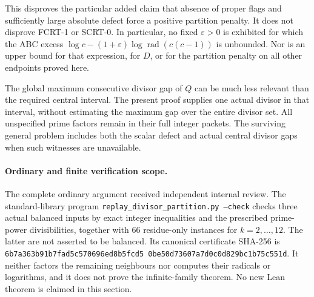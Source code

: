 This disproves the particular added claim that absence of proper flags
and sufficiently large absolute defect force a positive partition penalty.
It does not disprove FCRT-1 or SCRT-0. In particular, no fixed
\(\varepsilon>0\) is exhibited for which the ABC excess
\(\log c-(1+\varepsilon)\log\operatorname{rad}(c(c-1))\)
is unbounded. Nor is an upper bound for that expression, for \(D\),
or for the partition penalty on all other endpoints proved here.

The global maximum consecutive divisor gap of \(Q\) can be much less
relevant than the required central interval. The present proof supplies
one actual divisor in that interval, without estimating the maximum gap
over the entire divisor set. All unspecified prime factors remain in
their full integer packets. The surviving general problem includes both
the scalar defect and actual central divisor gaps when such witnesses
are unavailable.

\paragraph{Ordinary and finite verification scope.}
The complete ordinary argument received independent internal review.
The standard-library program
\texttt{replay\_\allowbreak divisor\_\allowbreak partition.py --check}
checks three actual balanced inputs by exact integer inequalities and
the prescribed prime-power divisibilities, together with 66 residue-only
instances for \(k=2,\ldots,12\). The latter are not asserted to be balanced.
Its canonical certificate SHA-256 is
\texttt{6b7a363b91b7fad5\allowbreak c570696ed8b5fcd5\allowbreak
0be50d73607a7d0c\allowbreak 0d829bc1b75c551d}.
It neither factors the remaining neighbours nor computes their radicals
or logarithms, and it does not prove the infinite-family theorem.
No new Lean theorem is claimed in this section.

